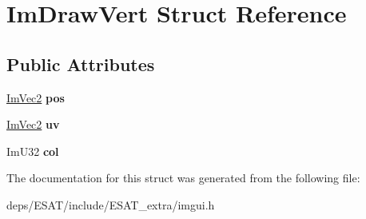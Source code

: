 \hypertarget{struct_im_draw_vert}{}\section{Im\+Draw\+Vert Struct Reference}
\label{struct_im_draw_vert}
\subsection*{Public Attributes}
\begin{DoxyCompactItemize}
\item 
\mbox{\label{struct_im_draw_vert_aedc578bbf364ddea71be12b4f177a5b4}} 
\mbox{\hyperlink{struct_im_vec2}{Im\+Vec2}} {\bfseries pos}
\item 
\mbox{\label{struct_im_draw_vert_abdf3183529055a6c3f709b23a4bf06b1}} 
\mbox{\hyperlink{struct_im_vec2}{Im\+Vec2}} {\bfseries uv}
\item 
\mbox{\label{struct_im_draw_vert_ab98ba53ce2690b56f5ba94682ed83940}} 
Im\+U32 {\bfseries col}
\end{DoxyCompactItemize}


The documentation for this struct was generated from the following file\+:\begin{DoxyCompactItemize}
\item 
deps/\+E\+S\+A\+T/include/\+E\+S\+A\+T\+\_\+extra/imgui.\+h\end{DoxyCompactItemize}
